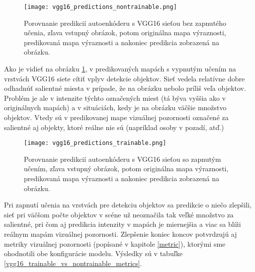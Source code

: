

\begin{figure}[H]
	\begin{center}
		\texttt{[image: vgg16\_predictions\_nontrainable.png]}
		\caption[Porovnanie predikcií autoenkóderu s VGG16 sieťou bez dodatočného trénovania voči reálnym mapám výraznosti]{
			Porovnanie predikcií autoenkóderu s VGG16 sieťou bez zapnutého učenia, zľava vstupný obrázok, potom originálna mapa výraznosti, predikovaná mapa výraznosti a nakoniec predikcia zobrazená na obrázku.
		}\label{vgg16_predictions_nontrainable}
	\end{center}
\end{figure}

Ako je vidieť na obrázku \ref{vgg16_predictions_nontrainable}, v predikovaných mapách s vypnutým učením na vrstvách VGG16 siete cítiť vplyv detekcie objektov. Sieť vedela relatívne dobre odhadnúť salientné miesta v prípade, že na obrázku nebolo príliš veľa objektov. Problém je ale v intenzite týchto označených miest (tá býva vyššia ako v originálnych mapách) a v situáciách, kedy je na obrázku väčšie množstvo objektov. Vtedy sú v predikovanej mape vizuálnej pozornosti  označené za salientné  aj objekty, ktoré reálne nie sú (napríklad osoby v pozadí, atď.)

\begin{figure}[H]
	\begin{center}
		\texttt{[image: vgg16\_predictions\_trainable.png]}
		\caption[Porovnanie predikcií autoenkóderu s VGG16 sieťou s dodatočným trénovaním voči reálnym mapám výraznosti]{
			Porovnanie predikcií autoenkóderu s VGG16 sieťou so zapnutým učením, zľava vstupný obrázok, potom originálna mapa výraznosti, predikovaná mapa výraznosti a nakoniec predikcia zobrazená na obrázku.
		}\label{vgg_predictions_trainable}
	\end{center}
\end{figure}

Pri zapnutí učenia na vrstvách pre detekciu objektov sa predikcie o niečo zlepšili, sieť pri väčšom počte objektov v scéne už neoznačila tak veľké množstvo za salientné, pri čom aj predikcia intenzity v mapách je miernejšia a viac sa blíži reálnym mapám vizuálnej pozornosti. Zlepšenie koniec koncov potvrdzujú aj metriky vizuálnej pozornosti (popísané v kapitole \ref{metric}), ktorými sme ohodnotili obe konfigurácie modelu. Výsledky sú v tabuľke \ref{vgg16_trainable_vs_nontrainable_metrics}.

